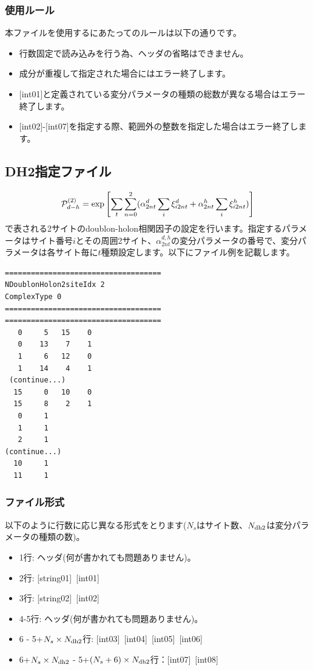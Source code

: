 \subsubsection{使用ルール}
本ファイルを使用するにあたってのルールは以下の通りです。
\begin{itemize}
\item 行数固定で読み込みを行う為、ヘッダの省略はできません。
\item 成分が重複して指定された場合にはエラー終了します。
\item $[$int01$]$と定義されている変分パラメータの種類の総数が異なる場合はエラー終了します。
\item $[$int02$]$-$[$int07$]$を指定する際、範囲外の整数を指定した場合はエラー終了します。
\end{itemize}

\newpage
\subsection{DH2指定ファイル}
\label{Subsec:DH2}

\begin{equation}
{\cal P}_{d-h}^{(2)}= \exp \left[ \sum_t \sum_{n=0}^2 (\alpha_{2nt}^d \sum_{i}\xi_{i2nt}^d+\alpha_{2nt}^h \sum_{i}\xi_{i2nt}^h)\right]
\end{equation}
で表される2サイトのdoublon-holon相関因子の設定を行います。指定するパラメータはサイト番号$i$とその周囲2サイト、$\alpha_{2nt}^{d,h}$の変分パラメータの番号で、変分パラメータは各サイト毎に$t$種類設定します。以下にファイル例を記載します。

\begin{minipage}{12.5cm}
\begin{screen}
\begin{verbatim}
====================================
NDoublonHolon2siteIdx 2  
ComplexType 0
====================================
====================================
   0     5   15    0
   0    13    7    1
   1     6   12    0
   1    14    4    1
 (continue...)
  15     0   10    0
  15     8    2    1
   0     1 
   1     1 
   2     1 
(continue...)
  10     1 
  11     1 
\end{verbatim}
\end{screen}
\end{minipage}

\subsubsection{ファイル形式}
以下のように行数に応じ異なる形式をとります($N_s$はサイト数、$N_{\rm dh2}$は変分パラメータの種類の数)。
 \begin{itemize}
   \item  1行:  ヘッダ(何が書かれても問題ありません)。
   \item  2行:   [string01]~[int01]
   \item  3行:   [string02]~[int02]
   \item  4-5行:  ヘッダ(何が書かれても問題ありません)。
   \item  6 - 5+$N_s\times N_{\rm dh2}$行: [int03]~[int04]~[int05]~[int06]
   \item  6+$N_s\times N_{\rm dh2}$ - 5+$(N_s+6) \times N_{\rm dh2}$行：[int07]~[int08]
  \end{itemize}
